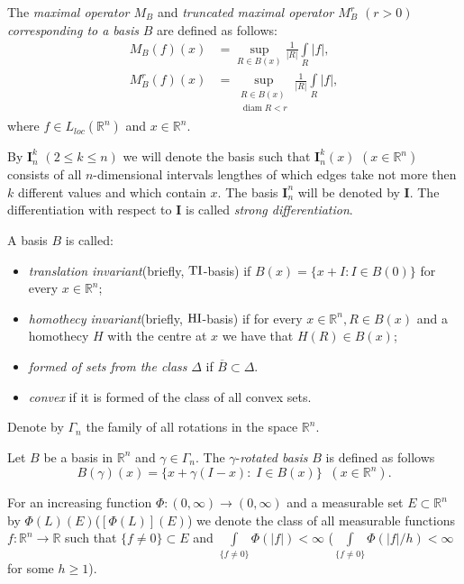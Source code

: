 \documentclass[12pt,reqno]{article}
\theoremstyle{remark}
\newcommand{\diam}{\operatorname{diam}}
\begin{document}
The \emph{maximal operator $M_B$} and  \emph{truncated maximal operator $M_B^{r}$ $(r>0)$ corresponding to a basis }$B$ are  defined as follows:
\begin{align*}
    M_B(f)(x) & =\sup_{R\in B(x)} \frac{1}{|R|} \int\limits_R |f|, \\
    M_B^r(f)(x) & =\sup_{\substack{R\in B(x) \\\diam R<r}}\frac{1}{|R|}\int\limits_R |f|,
\end{align*}
where $f\in L_{loc}(\mathbb{R}^n)$ and $x\in\mathbb{R}^n$.

By $\textbf{I}_n^{k}$ $(2\leq k\leq n)$ we will denote the basis such that $\textbf{I}_n^{k}(x)$ $(x\in \mathbb{R}^n)$ consists of all $n$-dimensional intervals  lengthes  of which edges take not more then $k$ different values and which contain $x$. The basis $\textbf{I}_n^{n}$ will be  denoted by $\textbf{I}$. The differentiation with respect to $\textbf{I}$ is called \emph{strong differentiation}.

A basis $B$ is called:
\begin{itemize}
\item \emph{translation invariant}(briefly, ${\rm TI}$-basis) if $B(x)=\{x+I: I\in B(0)\}$ for every $x\in\mathbb{R}^n$;

\item \emph{homothecy invariant}(briefly, ${\rm HI}$-basis) if for every $x\in\mathbb{R}^n, R\in B(x)$ and a homothecy $H$ with the centre at $x$ we have that $H(R)\in B(x)$;

\item \emph{formed of sets from the class} $\Delta$ if $\overline{B}\subset \Delta$.

\item \emph{convex} if it is formed of the class of all convex sets.
\end{itemize}

Denote by $\Gamma_n$ the family of all rotations in the space $\mathbb{R}^n$.

Let $B$ be a basis in $\mathbb{R}^n$ and $\gamma\in \Gamma_n$.  The $\gamma$-\emph{rotated basis} $B$ is defined as follows
$$  B(\gamma)(x)=\big\{x+\gamma(I - x):\;I\in B(x)\big\} \;\; (x\in\mathbb{R}^n).       $$

For  an increasing  function $\Phi: (0,\infty)\to (0,\infty)$ and a measurable set $E\subset\mathbb{R}^n$ by $\Phi(L)(E)$($[\Phi(L)](E)$) we denote the class of all measurable functions $f:\mathbb{R}^n\to \mathbb{R}$ such that $\{f\neq 0\}\subset E$ and $\int\limits_{\{f\neq 0\}}\Phi(|f|)<\infty$ ($\int\limits_{\{f\neq 0\}}\Phi(|f|/h)<\infty$ for some $h\geq 1$).
\end{document}
